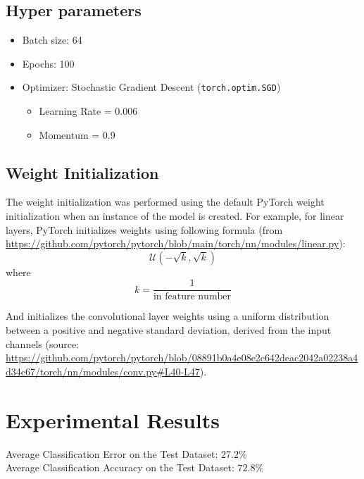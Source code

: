 \documentclass{article}
\newcommand{\learningrate}{0.006}
\newcommand{\testaccuracy}{72.8}
\newcommand{\testerror}{27.2}
\newcommand{\batchsize}{64}
\newcommand{\epochs}{100}
\newcommand{\momentum}{0.9}
\begin{document}
\subsection{Hyper parameters}
\begin{itemize}
    \item Batch size: \batchsize
    \item Epochs: \epochs
    \item Optimizer: Stochastic Gradient Descent (\verb|torch.optim.SGD|) \begin{itemize}
        \item Learning Rate = \learningrate
        \item Momentum = \momentum
        \end{itemize}
\end{itemize}

\subsection{Weight Initialization}
The weight initialization was performed using the default PyTorch weight initialization when an instance of the model is created. For example, for linear layers, PyTorch initializes weights using following formula (from \url{https://github.com/pytorch/pytorch/blob/main/torch/nn/modules/linear.py}):
\begin{equation*}
    \mathcal{U}(-\sqrt{k}, \sqrt{k})
\end{equation*}
where
\begin{equation*}
    k = \frac{1}{\text{in feature number}}
\end{equation*}

And initializes the convolutional layer weights using a uniform distribution between a positive and negative standard deviation, derived from the input channels (source: \url{https://github.com/pytorch/pytorch/blob/08891b0a4e08e2c642deac2042a02238a4d34c67/torch/nn/modules/conv.py#L40-L47}).

\section{Experimental Results}

Average Classification Error on the Test Dataset: $\testerror \%$ \\
Average Classification Accuracy on the Test Dataset: $\testaccuracy \%$
\end{document}

